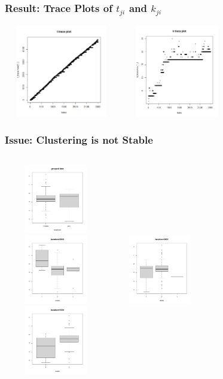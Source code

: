 \documentclass{beamer}
\begin{document}
	\begin{frame}
		\frametitle{Result: Trace Plots of $t_{ji}$ and $k_{ji}$}
		\includegraphics[width=5cm,height=4cm]{pic/image2.png}
		\includegraphics[width=5cm,height=4cm]{pic/image3.png}
	\end{frame}
	\begin{frame}
		\frametitle{Issue: Clustering is not Stable}
		\begin{columns}[t]
			\centering
			\includegraphics[width=4.5cm,height=3cm]{pic/image4.png}\\
			\includegraphics[width=4.5cm,height=3cm]{pic/image5.png}
			\centering
			\includegraphics[width=4.5cm,height=3cm]{pic/image6.png}\\
			\includegraphics[width=4.5cm,height=3cm]{pic/image7.png}
		\end{columns}
	\end{frame}
\end{document}
